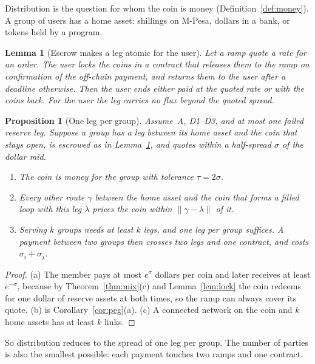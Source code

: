 \documentclass[11pt]{article}
\newtheorem{lemma}[theorem]{Lemma}
\newtheorem{proposition}[theorem]{Proposition}
\theoremstyle{definition}
\theoremstyle{remark}
\newcommand{\fc}[1]{\lVert #1\rVert}
\begin{document}
Distribution is the question for whom the coin is money (Definition~\ref{def:money}). A group of users has a home asset: shillings on M-Pesa, dollars in a bank, or tokens held by a program.

\begin{lemma}[Escrow makes a leg atomic for the user]\label{lem:escrow}
Let a ramp quote a rate for an order. The user locks the coins in a contract that releases them to the ramp on confirmation of the off-chain payment, and returns them to the user after a deadline otherwise. Then the user ends either paid at the quoted rate or with the coins back. For the user the leg carries no flux beyond the quoted spread.
\end{lemma}

\begin{proposition}[One leg per group]\label{prop:star}
Assume~A, \textup{D1}--\textup{D3}, and at most one failed reserve leg. Suppose a group has a leg between its home asset and the coin that stays open, is escrowed as in Lemma~\ref{lem:escrow}, and quotes within a half-spread $\sigma$ of the dollar mid.
\begin{enumerate}[label=\textup{(\alph*)}]
\item The coin is money for the group with tolerance $\tau=2\sigma$.
\item Every other route $\gamma$ between the home asset and the coin that forms a filled loop with this leg $\lambda$ prices the coin within $\fc{\gamma-\lambda}$ of it.
\item Serving $k$ groups needs at least $k$ legs, and one leg per group suffices. A payment between two groups then crosses two legs and one contract, and costs $\sigma_i+\sigma_j$.
\end{enumerate}
\end{proposition}

\begin{proof}
(a) The member pays at most $e^{\sigma}$ dollars per coin and later receives at least $e^{-\sigma}$, because by Theorem~\ref{thm:mix}(c) and Lemma~\ref{lem:lock} the coin redeems for one dollar of reserve assets at both times, so the ramp can always cover its quote. (b) is Corollary~\ref{cor:peg}(a). (c) A connected network on the coin and $k$ home assets has at least $k$ links.
\end{proof}

So distribution reduces to the spread of one leg per group. The number of parties is also the smallest possible: each payment touches two ramps and one contract.
\end{document}
